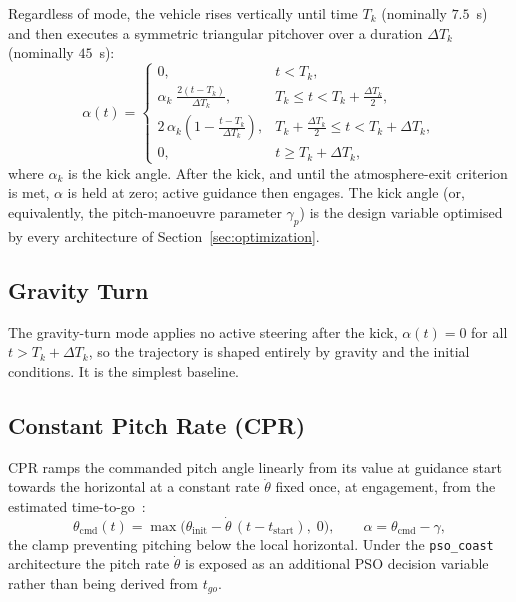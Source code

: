 Regardless of mode, the vehicle rises vertically until time $T_k$ (nominally
$7.5$~s) and then executes a symmetric triangular pitchover over a duration
$\Delta T_k$ (nominally $45$~s):
\begin{equation}
  \alpha(t) =
  \begin{cases}
    0, & t < T_k, \\[2pt]
    \displaystyle\alpha_k\;\frac{2(t - T_k)}{\Delta T_k},
      & T_k \le t < T_k + \tfrac{\Delta T_k}{2}, \\[6pt]
    \displaystyle 2\, \alpha_k\!\left(1 - \frac{t - T_k}{\Delta T_k}\right),
      & T_k + \tfrac{\Delta T_k}{2} \le t < T_k + \Delta T_k, \\[6pt]
    0, & t \ge T_k + \Delta T_k,
  \end{cases}
  \label{eq:kick_profile}
\end{equation}
where $\alpha_k$ is the kick angle. After the kick, and until the atmosphere-exit
criterion is met, $\alpha$ is held at zero; active guidance then engages. The
kick angle (or, equivalently, the pitch-manoeuvre parameter $\gamma_p$) is the
design variable optimised by every architecture of Section~\ref{sec:optimization}.

\subsection{Gravity Turn}
\label{ssec:gt}

The gravity-turn mode applies no active steering after the kick,
$\alpha(t)=0$ for all $t>T_k+\Delta T_k$, so the trajectory is shaped entirely by
gravity and the initial conditions. It is the simplest baseline.

\subsection{Constant Pitch Rate (CPR)}
\label{ssec:cpr}

CPR ramps the commanded pitch angle linearly from its value at guidance start
towards the horizontal at a constant rate $\dot\theta$ fixed once, at engagement,
from the estimated time-to-go~\cite{Ulrich}:
\begin{equation}
  \theta_{\mathrm{cmd}}(t) = \max\!\bigl(\theta_{\mathrm{init}}
        - \dot\theta\,(t - t_{\mathrm{start}}),\; 0\bigr),
  \qquad
  \alpha = \theta_{\mathrm{cmd}} - \gamma,
  \label{eq:cpr}
\end{equation}
the clamp preventing pitching below the local horizontal. Under the
\texttt{pso\_coast} architecture the pitch rate $\dot\theta$ is exposed as an
additional PSO decision variable rather than being derived from $t_{go}$.

